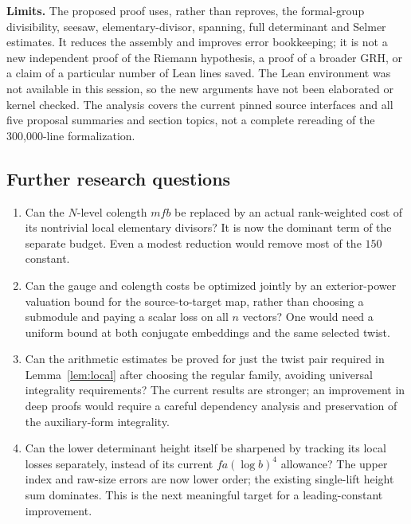 \documentclass[11pt,letterpaper]{article}
\theoremstyle{remark}\newtheorem{remark}[theorem]{Remark}
\begin{document}
\textbf{Limits.} The proposed proof uses, rather than reproves, the formal-group divisibility, seesaw, elementary-divisor, spanning, full determinant and Selmer estimates. It reduces the assembly and improves error bookkeeping; it is not a new independent proof of the Riemann hypothesis, a proof of a broader GRH, or a claim of a particular number of Lean lines saved. The Lean environment was not available in this session, so the new arguments have not been elaborated or kernel checked. The analysis covers the current pinned source interfaces and all five proposal summaries and section topics, not a complete rereading of the 300,000-line formalization.

\subsection{Further research questions}
\begin{enumerate}
\item Can the $N$-level colength $mfb$ be replaced by an actual rank-weighted cost of its nontrivial local elementary divisors? It is now the dominant term of the separate budget. Even a modest reduction would remove most of the $150$ constant.
\item Can the gauge and colength costs be optimized jointly by an exterior-power valuation bound for the source-to-target map, rather than choosing a submodule and paying a scalar loss on all $n$ vectors? One would need a uniform bound at both conjugate embeddings and the same selected twist.
\item Can the arithmetic estimates be proved for just the twist pair required in Lemma~\ref{lem:local} after choosing the regular family, avoiding universal integrality requirements? The current results are stronger; an improvement in deep proofs would require a careful dependency analysis and preservation of the auxiliary-form integrality.
\item Can the lower determinant height itself be sharpened by tracking its local losses separately, instead of its current $fa(\log b)^4$ allowance? The upper index and raw-size errors are now lower order; the existing single-lift height sum dominates. This is the next meaningful target for a leading-constant improvement.
\end{enumerate}
\end{document}
